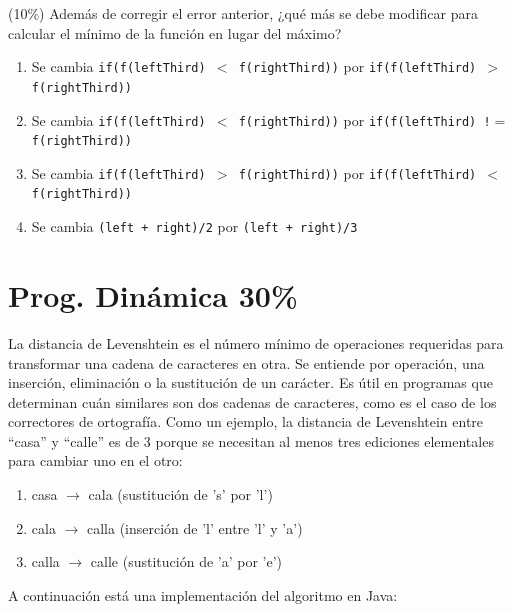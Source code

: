 \documentclass[twocolumn]{article}
\begin{document}

 (10\%) Además de corregir el error anterior, ¿qué más se debe modificar para calcular el mínimo de la función en lugar del máximo?

\begin{enumerate}[label=\Alph*]
\item Se cambia \texttt{if(f(leftThird) $<$ f(rightThird))} por \texttt{if(f(leftThird) $>$ f(rightThird))}\\
\item Se cambia \texttt{if(f(leftThird) $<$ f(rightThird))} por \texttt{if(f(leftThird) !$=$ f(rightThird))}\\
\item Se cambia \texttt{if(f(leftThird) $>$ f(rightThird))} por \texttt{if(f(leftThird) $<$ f(rightThird))}\\
\item Se cambia \texttt{(left + right)/2} por \texttt{(left + right)/3}
\end{enumerate}


\section{Prog. Dinámica 30\%}
La distancia de Levenshtein es el número mínimo de operaciones requeridas para transformar una cadena de caracteres en otra. Se entiende por operación, una inserción, eliminación o la sustitución de un carácter. Es útil en programas que determinan cuán similares son dos cadenas de caracteres, como es el caso de los correctores de ortografía. Como un ejemplo, la distancia de Levenshtein entre ``casa'' y ``calle'' es de $3$ porque se necesitan al menos tres ediciones elementales para cambiar uno en el otro:

\begin{enumerate}
   \item casa $\rightarrow$ cala (sustitución de 's' por 'l')
  \item  cala $\rightarrow$ calla (inserción de 'l' entre 'l' y 'a')
   \item calla $\rightarrow$ calle (sustitución de 'a' por 'e')
\end{enumerate}


A continuación está una implementación del algoritmo en Java:
\end{document}
